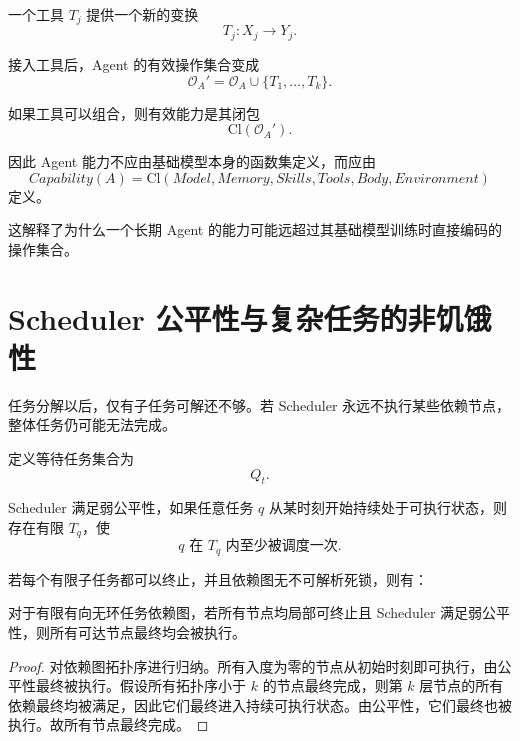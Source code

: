一个工具 $T_j$ 提供一个新的变换
\begin{equation}
T_j:
X_j
\rightarrow
Y_j.
\end{equation}

接入工具后，Agent 的有效操作集合变成
\begin{equation}
\mathcal O_A'
=
\mathcal O_A
\cup
\{T_1,\ldots,T_k\}.
\end{equation}

如果工具可以组合，则有效能力是其闭包
\begin{equation}
\mathrm{Cl}
\left(
\mathcal O_A'
\right).
\end{equation}

因此 Agent 能力不应由基础模型本身的函数集定义，而应由
\begin{equation}
\boxed{
Capability(A)
=
\mathrm{Cl}
\left(
Model,
Memory,
Skills,
Tools,
Body,
Environment
\right)
}
\end{equation}
定义。

这解释了为什么一个长期 Agent 的能力可能远超过其基础模型训练时直接编码的操作集合。

\section{Scheduler 公平性与复杂任务的非饥饿性}

任务分解以后，仅有子任务可解还不够。若 Scheduler 永远不执行某些依赖节点，整体任务仍可能无法完成。

定义等待任务集合为
\begin{equation}
Q_t.
\end{equation}

Scheduler 满足弱公平性，如果任意任务 $q$ 从某时刻开始持续处于可执行状态，则存在有限 $T_q$，使
\begin{equation}
q
\text{ 在 }
T_q
\text{ 内至少被调度一次}.
\end{equation}

若每个有限子任务都可以终止，并且依赖图无不可解析死锁，则有：

\begin{lemma}[公平调度进展引理]
对于有限有向无环任务依赖图，若所有节点均局部可终止且 Scheduler 满足弱公平性，则所有可达节点最终均会被执行。
\end{lemma}

\begin{proof}
对依赖图拓扑序进行归纳。所有入度为零的节点从初始时刻即可执行，由公平性最终被执行。假设所有拓扑序小于 $k$ 的节点最终完成，则第 $k$ 层节点的所有依赖最终均被满足，因此它们最终进入持续可执行状态。由公平性，它们最终也被执行。故所有节点最终完成。
\end{proof}

